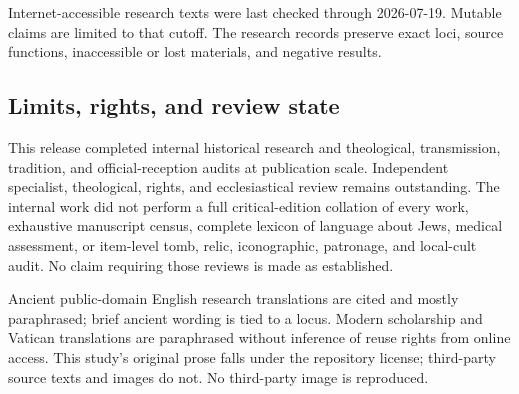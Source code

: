 Internet-accessible research texts were last checked through 2026-07-19.
Mutable claims are limited to that cutoff. The research records preserve exact
loci, source functions, inaccessible or lost materials, and negative results.

\subsection{Limits, rights, and review state}

This release completed internal historical research and theological,
transmission, tradition, and official-reception audits at publication scale.
Independent specialist, theological, rights, and ecclesiastical review remains
outstanding. The internal work did not perform a full
critical-edition collation of every work, exhaustive manuscript census,
complete lexicon of language about Jews, medical assessment, or item-level
tomb, relic, iconographic, patronage, and local-cult audit. No claim requiring
those reviews is made as established.

Ancient public-domain English research translations are cited and mostly
paraphrased; brief ancient wording is tied to a locus. Modern scholarship and
Vatican translations are paraphrased without inference of reuse rights from
online access. This study's original prose falls under the repository license;
third-party source texts and images do not. No third-party image is reproduced.

